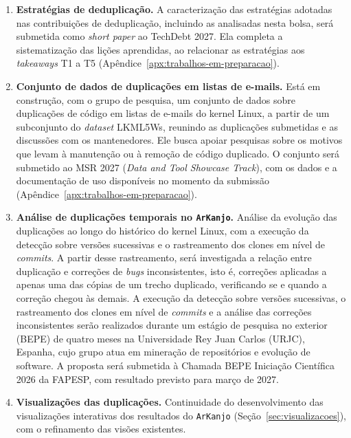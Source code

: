\documentclass[oneside]{abntlatex}
\begin{document}
\begingroup
\renewcommand{\labelenumi}{(\alph{enumi})}
\begin{enumerate}
    \item \textbf{Estratégias de deduplicação.} A caracterização das estratégias adotadas nas contribuições de deduplicação, incluindo as analisadas nesta bolsa, será submetida como \textit{short paper} ao TechDebt 2027. Ela completa a sistematização das lições aprendidas, ao relacionar as estratégias aos \textit{takeaways} T1 a T5 (Apêndice~\ref{apx:trabalhos-em-preparacao}).

    \item \textbf{Conjunto de dados de duplicações em listas de e-mails.} Está em construção, com o grupo de pesquisa, um conjunto de dados sobre duplicações de código em listas de e-mails do kernel Linux, a partir de um subconjunto do \textit{dataset} LKML5Ws\cite{passos2026lkml5ws}, reunindo as duplicações submetidas e as discussões com os mantenedores. Ele busca apoiar pesquisas sobre os motivos que levam à manutenção ou à remoção de código duplicado. O conjunto será submetido ao MSR 2027 (\textit{Data and Tool Showcase Track}), com os dados e a documentação de uso disponíveis no momento da submissão (Apêndice~\ref{apx:trabalhos-em-preparacao}).

    \item \textbf{Análise de duplicações temporais no \texttt{ArKanjo}.} Análise da evolução das duplicações ao longo do histórico do kernel Linux, com a execução da detecção sobre versões sucessivas e o rastreamento dos clones em nível de \textit{commits}. A partir desse rastreamento, será investigada a relação entre duplicação e correções de \textit{bugs} inconsistentes, isto é, correções aplicadas a apenas uma das cópias de um trecho duplicado, verificando se e quando a correção chegou às demais. A execução da detecção sobre versões sucessivas, o rastreamento dos clones em nível de \textit{commits} e a análise das correções inconsistentes serão realizados durante um estágio de pesquisa no exterior (BEPE) de quatro meses na Universidade Rey Juan Carlos (URJC), Espanha, cujo grupo atua em mineração de repositórios e evolução de software. A proposta será submetida à Chamada BEPE Iniciação Científica 2026 da FAPESP, com resultado previsto para março de 2027.

    \item \textbf{Visualizações das duplicações.} Continuidade do desenvolvimento das visualizações interativas dos resultados do \texttt{ArKanjo} (Seção~\ref{sec:visualizacoes}), com o refinamento das visões existentes.
\end{enumerate}
\endgroup
\end{document}
